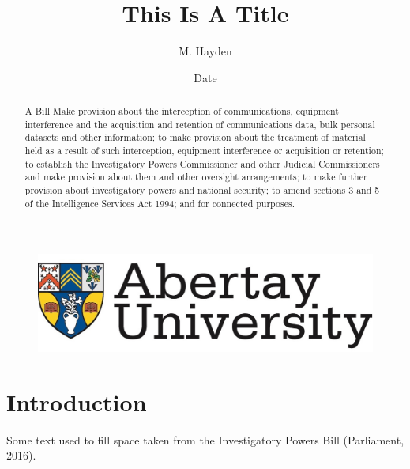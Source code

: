 \documentclass[12pt,a4paper]{article}
\title{This Is A Title}
\author{M. Hayden}
\affil{BSc Ethical Hacking\\
		Abertay University\\
		Dundee, United Kingdom\\
		StudentNumber@abertay.ac.uk}
\date{Date}
\begin{document}

	\begin{figure}
		\includegraphics[width=\linewidth]{img/unilogo}
	\end{figure}

	\maketitle

	\newpage				
		\begin{abstract}
		 A Bill Make provision about the interception of communications, equipment
interference and the acquisition and retention of communications data, bulk
personal datasets and other information; to make provision about the
treatment of material held as a result of such interception, equipment
interference or acquisition or retention; to establish the Investigatory Powers
Commissioner and other Judicial Commissioners and make provision about
them and other oversight arrangements; to make further provision about
investigatory powers and national security; to amend sections 3 and 5 of the
Intelligence Services Act 1994; and for connected purposes.			
			
		\end{abstract}

	\newpage
	\tableofcontents
	\newpage
				
		

	\section{Introduction}
		 Some text used to fill space taken from the Investigatory Powers Bill (Parliament, 2016).
		
\end{document}
